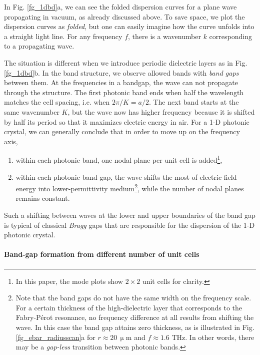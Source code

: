 In Fig. \ref{fg_1dbd}a, we can see the folded dispersion curves for a plane wave propagating in vacuum, as already discussed above. 
To save space, we plot the  dispersion curves as \textit{folded}, but one can easily imagine how the curve unfolds into a straight light line. For any frequency $f$, there is a wavenumber $k$ corresponding to a propagating wave. 


The situation is different when we introduce periodic dielectric layers as in Fig. \ref{fg_1dbd}b. In the band structure, we observe allowed bands with \textit{band gaps} between them. At the frequencies in a bandgap, the wave can not propagate through the structure. The first photonic band ends when half the wavelength matches the cell spacing, i.e. when $2\pi / K= a/2$. The next band starts at the same wavenumber $K$, but the wave now has higher frequency because it is shifted by half its period so that it maximizes electric energy in air. For a 1-D photonic crystal, we can generally conclude that in order to move up on the frequency axis,
\begin{enumerate}
 \item{within each photonic band, one nodal plane per unit cell is added\footnote{In this paper, the mode plots show $2\times 2$ unit cells for clarity.},} 
 \item{within each photonic band gap, the wave shifts the most of electric field energy into lower-permittivity medium\footnote{Note that the band gaps do not have the same width on the frequency scale. For a certain thickness of the high-dielectric layer that corresponds to the Fabry-Pérot resonance, no frequency difference at all results from shifting the wave. In this case the band gap attains zero thickness, as is illustrated in Fig. \ref{fg_ebar_radiusscan}a for $r\approx20\,\upmu$m and $f\approx1.6$ THz. In other words, there may be a \textit{gap-less} transition between photonic bands.}, while the number of nodal planes remains constant. }
 \end{enumerate}

Such a shifting between waves at the lower and upper boundaries of the band gap is typical of classical \textit{Bragg} gaps that are responsible for the dispersion of the 1-D photonic crystal. 
\paragraph{Band-gap formation from different number of unit cells}%

